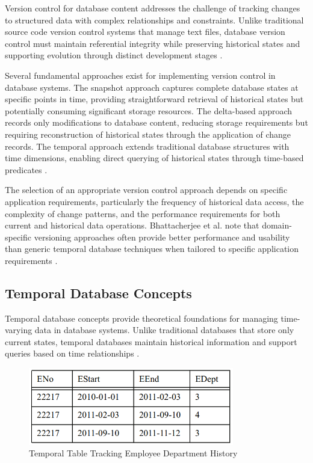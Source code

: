 Version control for database content addresses the challenge of tracking changes to structured data with complex relationships and constraints. Unlike traditional source code version control systems that manage text files, database version control must maintain referential integrity while preserving historical states and supporting evolution through distinct development stages \cite{tichy1985rcs}.

Several fundamental approaches exist for implementing version control in database systems. The snapshot approach captures complete database states at specific points in time, providing straightforward retrieval of historical states but potentially consuming significant storage resources. The delta-based approach records only modifications to database content, reducing storage requirements but requiring reconstruction of historical states through the application of change records. The temporal approach extends traditional database structures with time dimensions, enabling direct querying of historical states through time-based predicates \cite{bhattacherjee2015principles}.

The selection of an appropriate version control approach depends on specific application requirements, particularly the frequency of historical data access, the complexity of change patterns, and the performance requirements for both current and historical data operations. Bhattacherjee et al. note that domain-specific versioning approaches often provide better performance and usability than generic temporal database techniques when tailored to specific application requirements \cite{bhattacherjee2015principles}.

\subsection{Temporal Database Concepts}
\label{subsec:temporal-database-concepts}

Temporal database concepts provide theoretical foundations for managing time-varying data in database systems. Unlike traditional databases that store only current states, temporal databases maintain historical information and support queries based on time relationships \cite{snodgrass1999developing}.

\begin{figure}[ht]
    \centering
    \includegraphics[width=0.8\textwidth]{figures/temporal_database.png}
    \caption{Temporal Table Tracking Employee Department History \cite{kulkarni2012temporal}}
    \label{fig:temporal-database}
\end{figure}


